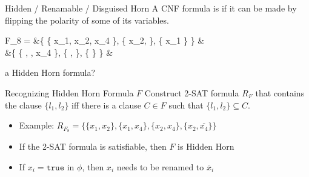 \documentclass[t]{sdqbeamer}
\begin{document}
\begin{frame}{Hidden / Renamable / Disguised Horn}
	A CNF formula is  if it can be made  by flipping the polarity of some of its variables.
	\begin{example}
		\vspace*{-3ex}
		\begin{flalign*}
			F_8 = &\{ \{ x_1, x_2, x_4 \}, \{ x_2,  \}, \{ x_1 \} \} &\\
			\leadsto &\{ \{ , , x_4 \}, \{ ,  \}, \{  \} \} &
		\end{flalign*}
	\end{example}
	 a Hidden Horn formula? 
	\pause
	\begin{block}{Recognizing Hidden Horn Formula $F$}
		Construct 2-SAT formula $R_F$ that contains the clause $\{l_1, l_2\}$ iff there is a clause $C \in F$ such that $\{l_1, l_2\} \subseteq C$.\\[1ex]
		\begin{itemize}\setlength{\itemsep}{1em}
			\item Example: $R_{F_8} = \{ \{ x_1, x_2 \}, \{ x_1, x_4 \}, \{ x_2, x_4 \}, \{ x_2, \overline{x_4} \} \}$
			\item If the 2-SAT formula is satisfiable, then $F$ is Hidden Horn
			\item If $x_i = \texttt{true}$ in $\phi$, then $x_i$ needs to be renamed to $\overline x_i$
		\end{itemize}
	\end{block}
\end{frame}
\end{document}

